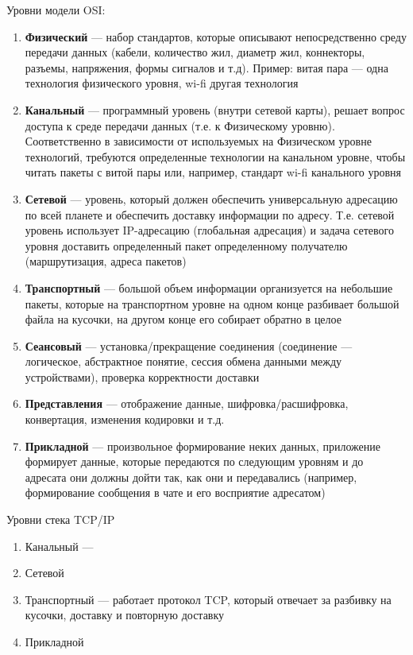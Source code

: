 \documentclass[a4paper]{article}
\begin{document}
Уровни модели OSI:
\begin{enumerate}
	\item \textbf{Физический} --- набор стандартов, которые описывают непосредственно среду передачи данных (кабели, количество жил, диаметр жил, коннекторы, разъемы, напряжения, формы сигналов и т.д). Пример: витая пара --- одна технология физического уровня, wi-fi другая технология
	\item \textbf{Канальный} --- программный уровень (внутри сетевой карты), решает вопрос доступа к среде передачи данных (т.е. к Физическому уровню). Соответственно в зависимости от используемых на Физическом уровне технологий, требуются определенные технологии на канальном уровне, чтобы читать пакеты с витой пары или, например, стандарт wi-fi канального уровня 
	\item \textbf{Сетевой} --- уровень, который должен обеспечить универсальную адресацию по всей планете и обеспечить доставку информации по адресу. Т.е. сетевой уровень использует IP-адресацию (глобальная адресация) и задача сетевого уровня доставить определенный пакет определенному получателю (маршрутизация, адреса пакетов)
	\item \textbf{Транспортный} --- большой объем информации организуется на небольшие пакеты, которые на транспортном уровне на одном конце разбивает большой файла на кусочки, на другом конце его собирает обратно в целое
	\item \textbf{Сеансовый} --- установка/прекращение соединения (соединение --- логическое, абстрактное понятие, сессия обмена данными между устройствами), проверка корректности доставки
	\item \textbf{Представления} --- отображение данные, шифровка/расшифровка, конвертация, изменения кодировки и т.д.
	\item \textbf{Прикладной} --- произвольное формирование неких данных, приложение формирует данные, которые передаются по следующим уровням и до адресата они должны дойти так, как они и передавались (например, формирование сообщения в чате и его восприятие адресатом)
\end{enumerate}

Уровни стека TCP/IP
\begin{enumerate}
	\item Канальный --- 
	\item Сетевой
	\item Транспортный --- работает протокол TCP, который отвечает за разбивку на кусочки, доставку и повторную доставку
	\item Прикладной 
\end{enumerate}
\end{document}

